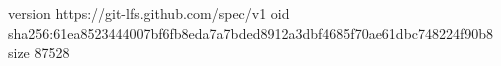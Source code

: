 version https://git-lfs.github.com/spec/v1
oid sha256:61ea8523444007bf6fb8eda7a7bded8912a3dbf4685f70ae61dbc748224f90b8
size 87528
